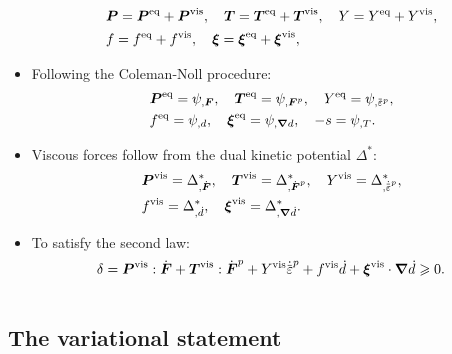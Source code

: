 \begin{frame}
\begin{columns}
\begin{column}{0.6\textwidth}
\begin{itemize}
              \begin{align*}
                 & \boldsymbol{P} = \boldsymbol{P}^\text{eq} + \boldsymbol{P}^\text{vis}, \quad \boldsymbol{T} = \boldsymbol{T}^\text{eq} + \boldsymbol{T}^\text{vis}, \quad Y = Y^\text{eq} + Y^\text{vis}, \\
                 & f = f^\text{eq} + f^\text{vis}, \quad \boldsymbol{\xi} = \boldsymbol{\xi}^\text{eq} + \boldsymbol{\xi}^\text{vis},                                    
              \end{align*}
        \item Following the Coleman-Noll procedure:
              \begin{align*}
                 & \bfP^\text{eq} = \psi_{,\defgrad}, \quad \bfT^\text{eq} = \psi_{,\defgrad^p}, \quad Y^\text{eq} = \psi_{,\ep}, \\
                 & f^\text{eq} = \psi_{,d}, \quad \bs{\xi}^\text{eq} = \psi_{,\grad d}, \quad -s = \psi_{,T}.                     
              \end{align*}
        \item Viscous forces follow from the dual kinetic potential $\Delta^*$:
              \begin{align*}
                 & \bfP^\text{vis} = \Delta^*_{,\dot{\defgrad}}, \quad \bfT^\text{vis} = \Delta^*_{,\dot{\defgrad}^p}, \quad Y^\text{vis} = \Delta^*_{,\epdot}, \\
                 & f^\text{vis} = \Delta^*_{,\dot{d}}, \quad \bs{\xi}^\text{vis} = \Delta^*_{,\grad\dot{d}}.                                                    
              \end{align*}
        \item To satisfy the second law:
              \begin{align*}
                \delta = \bfP^\text{vis}:\dot{\defgrad} + \bfT^\text{vis}:\dot{\defgrad}^p + Y^\text{vis}\epdot + f^\text{vis}\dot{d} + \bs{\xi}^\text{vis}\cdot\grad \dot{d} \geqslant 0.
              \end{align*}
      \end{itemize}
    \end{column}
  \end{columns}
\end{frame}

\subsection{The variational statement}

